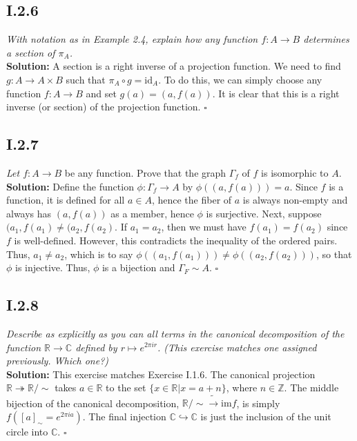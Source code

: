 \documentclass[11pt,a4paper]{article}
\begin{document}
\subsection*{I.2.6} \textit{With notation as in Example 2.4, explain how any function $f: A \rightarrow B$ determines a section of $\pi_A$.} \\

\noindent \textbf{Solution:} A section is a right inverse of a projection function.  We need to find $g: A \rightarrow A \times B$ such that $\pi_A \circ g = \text{id}_A$.  To do this, we can simply choose any function $f: A \rightarrow B$ and set $g(a) = (a, f(a))$.  It is clear that this is a right inverse (or section) of the projection function. $\square$

\subsection*{I.2.7} \textit{Let $f: A \rightarrow B$} be any function. Prove that the graph $\Gamma_f$ of $f$ is isomorphic to $A$. \\

\noindent \textbf{Solution:} Define the function $\phi: \Gamma_f \rightarrow A$ by $\phi((a, f(a))) = a$.  Since $f$ is a function, it is defined for all $a \in A$, hence the fiber of $a$ is always non-empty and always has $(a, f(a))$ as a member, hence $\phi$ is surjective.  Next, suppose $(a_1, f(a_1) \neq (a_2, f(a_2)$.  If $a_1 = a_2$, then we must have $f(a_1) = f(a_2)$ since $f$ is well-defined.  However, this contradicts the inequality of the ordered pairs.  Thus, $a_1 \neq a_2$, which is to say $\phi((a_1, f(a_1))) \neq \phi((a_2, f(a_2)))$, so that $\phi$ is injective.  Thus, $\phi$ is a bijection and $\Gamma_F \sim A$. $\square$

\subsection*{I.2.8} \textit{Describe as explicitly as you can all terms in the canonical decomposition of the function $\mathbb{R} \rightarrow \mathbb{C}$ defined by $r \mapsto e^{2\pi i r}$. (This exercise matches one assigned previously.  Which one?)} \\

\textbf{Solution: } This exercise matches Exercise I.1.6.    The canonical projection $\mathbb{R} \twoheadrightarrow \mathbb{R}/\sim$ takes $a \in \mathbb{R}$ to the set $\{x \in \mathbb{R} | x = a + n\}$, where $n \in \mathbb{Z}$.  The middle bijection of the canonical decomposition, $\mathbb{R}/\sim \tilde{\rightarrow} \text{im} f$, is simply $f([a]_{\sim} = e^{2 \pi i a})$.  The final injection $\mathbb{C} \hookrightarrow \mathbb{C}$ is just the inclusion of the unit circle into $\mathbb{C}$. $\square$
\end{document}
